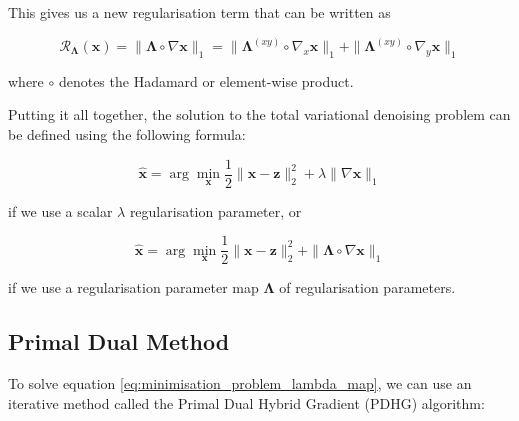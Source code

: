 \documentclass[12pt]{article}
\begin{document}
This gives us a new regularisation term that can be written as

\begin{equation}
  \mathcal{R}_{\mathbf{\Lambda}}(\mathbf{x}) = \| \mathbf{\Lambda} \circ \nabla \mathbf{x} \|_1
  = \| \mathbf{\Lambda}^{(xy)} \circ \nabla_x \mathbf{x} \|_1 + \| \mathbf{\Lambda}^{(xy)} \circ \nabla_y \mathbf{x} \|_1
\end{equation}

where $\circ$ denotes the Hadamard or element-wise product.



Putting it all together,
the solution to the total variational denoising problem
can be 
defined
using the following formula:

\begin{equation}
  \hat{\mathbf{x}} = \arg \min_{\mathbf{x}} \frac{1}{2} \|\mathbf{x} - \mathbf{z}\|_2^2 + \lambda \| \nabla \mathbf{x} \|_1
\end{equation}

if we use a scalar $\lambda$ regularisation parameter, or

\begin{equation} \label{eq:minimisation_problem_lambda_map}
  \hat{\mathbf{x}} = \arg \min_{\mathbf{x}} \frac{1}{2} \|\mathbf{x} - \mathbf{z}\|_2^2 + \| \mathbf{\Lambda} \circ \nabla \mathbf{x} \|_1
\end{equation}

if we use a regularisation parameter map $\mathbf{\Lambda}$ of regularisation parameters.




\subsection{Primal Dual Method}

To solve equation \ref{eq:minimisation_problem_lambda_map},
we can use an iterative method called the Primal Dual Hybrid Gradient (PDHG) algorithm: 
\end{document}
